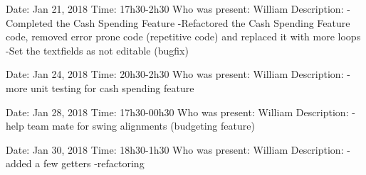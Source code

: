 \documentclass{article}
\begin{document}
    \begin{flushleft}
        Date: Jan 21, 2018 \newline
        Time: 17h30-2h30 \newline
        Who was present: William \newline
        Description: \newline
        -Completed the Cash Spending Feature \newline
        -Refactored the Cash Spending Feature code, removed error prone code (repetitive code) and replaced it with more loops \newline
        -Set the textfields as not editable (bugfix) \newline
    \end{flushleft}
    \vspace{2em}

    \begin{flushleft}
        Date: Jan 24, 2018 \newline
        Time: 20h30-2h30 \newline
        Who was present: William \newline
        Description: \newline
        -more unit testing for cash spending feature \newline
    \end{flushleft}
    \vspace{2em}

    \begin{flushleft}
        Date: Jan 28, 2018 \newline
        Time: 17h30-00h30 \newline
        Who was present: William \newline
        Description: \newline
        -help team mate for swing alignments (budgeting feature) \newline
    \end{flushleft}
    \vspace{2em}

    \begin{flushleft}
        Date: Jan 30, 2018 \newline
        Time: 18h30-1h30 \newline
        Who was present: William \newline
        Description: \newline
        -added a few getters -refactoring \newline
    \end{flushleft}
    \vspace{2em}
\end{document}
